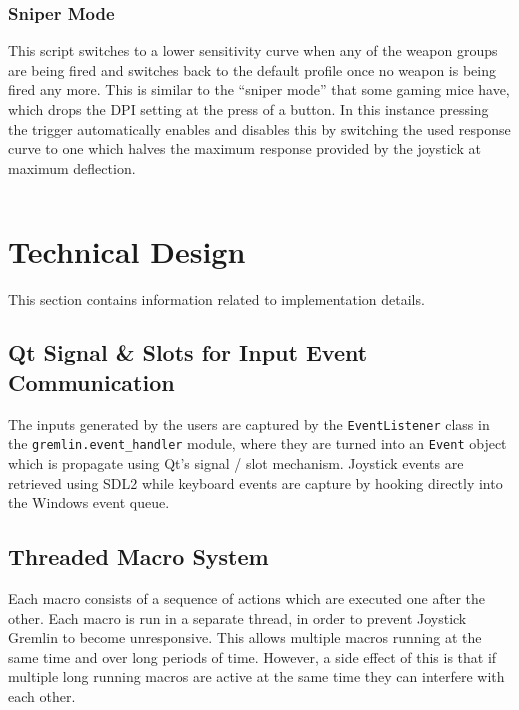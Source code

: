 \documentclass[a4, 10pt]{article}
\newcommand{\JG}{Joystick Gremlin}
\begin{document}
\inputminted[xleftmargin=2em]{python}{examples/mode_switching.py}


\subsubsection{Sniper Mode}

This script switches to a lower sensitivity curve when any of the
weapon groups are being fired and switches back to the default profile
once no weapon is being fired any more. This is similar to the ``sniper
mode'' that some gaming mice have, which drops the DPI setting at the
press of a button. In this instance pressing the trigger automatically
enables and disables this by switching the used response curve to one
which halves the maximum response provided by the joystick at maximum
deflection.

\inputminted[xleftmargin=2em]{python}{examples/sniper_mode.py}



\section{Technical Design}
\label{sec:technical_design}

This section contains information related to implementation details.


\subsection{Qt Signal \& Slots for Input Event Communication}

The inputs generated by the users are captured by the
\verb+EventListener+ class in the \verb+gremlin.event_handler+ module,
where they are turned into an \verb+Event+ object which is propagate
using Qt's signal / slot mechanism. Joystick events are retrieved using
SDL2 while keyboard events are capture by hooking directly into the
Windows event queue.


\subsection{Threaded Macro System}

Each macro consists of a sequence of actions which are executed one
after the other. Each macro is run in a separate thread, in order to
prevent \JG{} to become unresponsive. This allows multiple macros
running at the same time and over long periods of time. However, a side
effect of this is that if multiple long running macros are active at the
same time they can interfere with each other.
\end{document}

